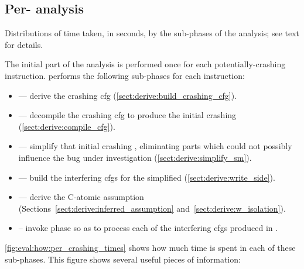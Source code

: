 \newpage
\subsection{Per- analysis}

\begin{sanefig}
  \caption{Distributions of time taken, in seconds, by the
     sub-phases of the analysis; see text for details.}
  \label{fig:eval:how:per_crashing_times}
\end{sanefig}

\noindent
The initial part of the analysis is performed once for each
potentially-crashing instruction.  {\Technique} performs the following
sub-phases for each instruction:
\begin{itemize}
\item {} --- derive the crashing \gls{cfg}
  (\autoref{sect:derive:build_crashing_cfg}).
\item {} --- decompile the crashing \gls{cfg} to produce the
  initial crashing {\StateMachine}
  (\autoref{sect:derive:compile_cfg}).
\item {} --- simplify that initial crashing {\StateMachine},
  eliminating parts which could not possibly influence the bug under
  investigation (\autoref{sect:derive:simplify_sm}).
\item {} --- build the interfering \glspl{cfg} for the
  simplified {\StateMachine} (\autoref{sect:derive:write_side}).
\item {} --- derive the C-atomic assumption
  (Sections~\ref{sect:derive:inferred_assumption}
  and~\ref{sect:derive:w_isolation}).
\item {} -- invoke phase \subinterfering{} so as to process
  each of the interfering \glspl{cfg} produced in .
\end{itemize}
\autoref{fig:eval:how:per_crashing_times} shows how much time is spent
in each of these sub-phases.  This figure shows several useful pieces
of information:
